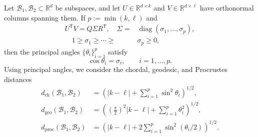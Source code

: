 \documentclass[letterpaper, 10 pt, conference]{ieeeconf}  %
\DeclareMathOperator*{\diag}{diag}
\newcommand{\R}{\mathbb{R}}
\newcommand{\T}{^{\mathsf T}}
\begin{document}
Let $\mathcal B_1,\mathcal B_2\subset\R^d$ be subspaces, and let $U\in\R^{d\times k}$ and $V\in\R^{d\times\ell}$ have orthonormal columns spanning them. If $p:=\min(k,\ell)$ and
\begin{equation}
    \begin{aligned}
        U\T V=Q\Sigma R\T,
        \quad \Sigma=&\diag(\sigma_1,\ldots,\sigma_p),\\
        \quad 1\geq\sigma_1\geq\cdots\geq&\sigma_p\geq0,
    \end{aligned}
    \label{eq:svd_principal_angles}
\end{equation}
then the principal angles $\{\theta_i\}_{i=1}^{p}$ satisfy
\begin{equation}
  \cos\theta_i=\sigma_i,\qquad i=1,\ldots,p.
  \label{eq:principal_angles}
\end{equation}
Using principal angles, we consider the chordal, geodesic, and Procrustes distances
\begin{align}
    d_{\mathrm{ch}}(\mathcal B_1,\mathcal B_2)
    &=\left(|k-\ell|+\sum_{i=1}^{p}\sin^2\theta_i\right)^{1/2},
    \label{eq:chordal_distance}\\
    d_{\mathrm{geo}}(\mathcal B_1,\mathcal B_2)
    &=\left(\left(\frac{\pi}{2}\right)^2|k-\ell|+\sum_{i=1}^{p}\theta_i^2\right)^{1/2},
    \label{eq:geodesic_distance}\\
    d_{\mathrm{proc}}(\mathcal B_1,\mathcal B_2)
    &=\left(|k-\ell|+2\sum_{i=1}^{p}\sin^2(\theta_i/2)\right)^{1/2}.
    \label{eq:procrustes_distance}
\end{align}
\end{document}

